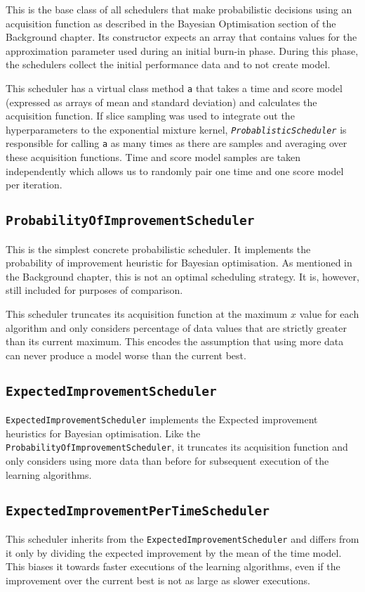 \documentclass[a4paper,12pt,twoside,openright]{report}
\begin{document}
This is the base class of all schedulers that make probabilistic decisions using an acquisition function as described in the Bayesian Optimisation section of the Background chapter. Its constructor expects an array that contains values for the approximation parameter used during an initial burn-in phase. During this phase, the schedulers collect the initial performance data and to not create model.

This scheduler has a virtual class method \texttt{a} that takes a time and score model (expressed as arrays of mean and standard deviation) and calculates the acquisition function. If slice sampling was used to integrate out the hyperparameters to the exponential mixture kernel, \texttt{\textit{ProbablisticScheduler}} is responsible for calling \texttt{a} as many times as there are samples and averaging over these acquisition functions. Time and score model samples are taken independently which allows us to randomly pair one time and one score model per iteration.

\subsection{\texttt{ProbabilityOfImprovementScheduler}}
This is the simplest concrete probabilistic scheduler. It implements the probability of improvement heuristic for Bayesian optimisation. As mentioned in the Background chapter, this is not an optimal scheduling strategy. It is, however, still included for purposes of comparison.

This scheduler truncates its acquisition function at the maximum $x$ value for each algorithm and only considers percentage of data values that are strictly greater than its current maximum. This encodes the assumption that using more data can never produce a model worse than the current best.

\subsection{\texttt{ExpectedImprovementScheduler}}
\texttt{ExpectedImprovementScheduler} implements the Expected improvement heuristics for Bayesian optimisation. Like the \texttt{ProbabilityOfImprovementScheduler}, it truncates its acquisition function and only considers using more data than before for subsequent execution of the learning algorithms.

\subsection{\texttt{ExpectedImprovementPerTimeScheduler}}
This scheduler inherits from the \texttt{ExpectedImprovementScheduler} and differs from it only by dividing the expected improvement by the mean of the time model. This biases it towards faster executions of the learning algorithms, even if the improvement over the current best is not as large as slower executions.
\end{document}
